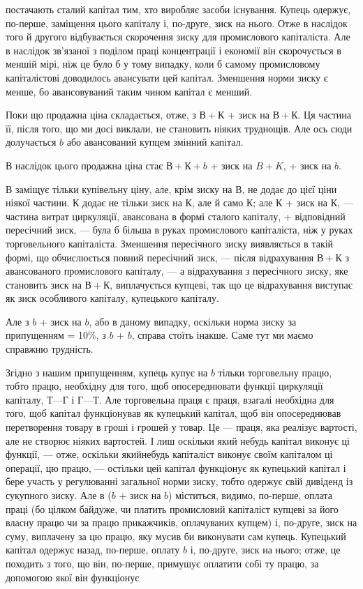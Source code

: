 \parcont{}  %
постачають сталий капітал тим, хто виробляє засоби існування.
Купець одержує, по-перше, заміщення цього капіталу і, по-друге,
зиск на нього. Отже в наслідок того й другого відбувається
скорочення зиску для промислового капіталіста. Але в наслідок
зв’язаної з поділом праці концентрації і економії він скорочується
в меншій мірі, ніж це було б у тому випадку, коли б самому
промисловому капіталістові доводилось авансувати цей капітал.
Зменшення норми зиску є менше, бо авансовуваний таким чином
капітал є менший.

Поки що продажна ціна складається, отже, з $В + К$ + зиск на
$В + К$. Ця частина її, після того, що ми досі виклали, не становить
ніяких труднощів. Але ось сюди долучається $b$ або авансований
купцем змінний капітал.

В наслідок цього продажна ціна стає $В + К + b$ + зиск на
$B + K$, + зиск на $b$.

$В$ заміщує тільки купівельну ціну, але, крім зиску на $В$, не
додає до цієї ціни ніякої частини. $К$ додає не тільки зиск на $К$,
але й само $К$; але $К$ + зиск на $К$, — частина витрат циркуляції,
авансована в формі сталого капіталу, + відповідний пересічний
зиск, — була б більша в руках промислового капіталіста, ніж у
руках торговельного капіталіста. Зменшення пересічного зиску
виявляється в такій формі, що обчислюється повний пересічний
зиск, — після відрахування $В + К$ з авансованого промислового
капіталу, — а відрахування з пересічного зиску, яке становить
зиск на $В + К$, виплачується купцеві, так що це відрахування
виступає як зиск особливого капіталу, купецького капіталу.

Але з $b$ + зиск на $b$, або в даному випадку, оскільки норма
зиску за припущенням = 10\%, з $b$ +  $b$, справа стоїть інакше.
Саме тут ми маємо справжню трудність.

Згідно з нашим припущенням, купець купує на $b$ тільки торговельну
працю, тобто працю, необхідну для того, щоб опосереднювати
функції циркуляції капіталу, $Т — Г$ і $Г — Т$. Але торговельна
праця є праця, взагалі необхідна для того, щоб капітал
функціонував як купецький капітал, щоб він опосереднював перетворення
товару в гроші і грошей у товар. Це — праця, яка реалізує
вартості, але не створює ніяких вартостей. І лиш оскільки
який небудь капітал виконує ці функції, — отже, оскільки якийнебудь
капіталіст виконує своїм капіталом ці операції, цю працю,
— остільки цей капітал функціонує як купецький капітал
і бере участь у регулюванні загальної норми зиску, тобто одержує
свій дивіденд із сукупного зиску. Але в ($b$ + зиск на $b$) міститься,
видимо, по-перше, оплата праці (бо цілком байдуже, чи платить
промисловий капіталіст купцеві за його власну працю чи за працю
прикажчиків, оплачуваних купцем) і, по-друге, зиск на суму,
виплачену за цю працю, яку мусив би виконувати сам купець.
Купецький капітал одержує назад, по-перше, оплату $b$ і, по-друге,
зиск на нього; отже, це походить з того, що він, по-перше, примушує
оплатити собі ту працю, за допомогою якої він функціонує
\parbreak{}  %
